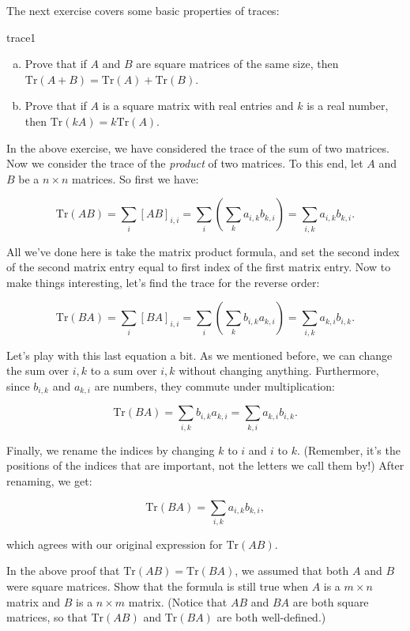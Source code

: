 The next exercise covers some basic properties of traces:

\begin{exercise}{trace1}
\begin{enumerate}[(a)]
\item
Prove that if $A$ and $B$ are square matrices of the same size, then $\text{Tr} \left( A + B \right) = \text{Tr} \left( A \right) + \text{Tr} \left( B \right)$.
\item
Prove that if $A$ is a square matrix with real entries and $k$ is a real number, then $\text{Tr} \left(k A  \right) = k\text{Tr} \left( A \right)$.
\end{enumerate}
\end{exercise}


In the above exercise, we have considered the trace of the sum of two matrices. Now we consider the trace of the \emph{product} of two matrices.  To this end, let ${A}$ and  ${B}$ be a $n \times n$ matrices.  So first we have:

\[ \text{Tr} \left({A} {B}\right) = \sum_{i} [AB]_{i,i} = \sum_{i}\left( \sum_k a_{i,k}b_{k,i}\right) = \sum_{i,k}a_{i,k}b_{k,i}. \]

All we've done here is take the matrix product formula, and set the second index of the second  matrix entry equal to first index of the first matrix entry.  Now to make things interesting, let's find the trace for the reverse order:

\[ \text{Tr} \left({B} {A}\right) = \sum_{i} [BA]_{i,i} = \sum_{i} \left( \sum_{k} b_{i,k}a_{k,i} \right) = \sum_{i,k}a_{k,i}b_{i,k}. \]

Let's play with this last equation a bit. As we mentioned before, we can change the sum over $i,k$ to a sum over $i,k$ without changing anything. Furthermore, since $b_{i,k}$ and $a_{k,i}$ are numbers, they commute under multiplication:

\[ \text{Tr} \left({B} {A}\right) =\sum_{i,k} b_{i,k}a_{k,i} =  \sum_{k,i} a_{k,i}b_{i,k}. \]

Finally, we rename the indices by changing $k$ to $i$ and $i$ to $k$.  (Remember, it's the positions of the indices that are important, not the letters we call them by!)  After renaming, we get:

\[ \text{Tr} \left({B} {A}\right) =\sum_{i,k} a_{i,k}b_{k,i}, \]

which agrees with our original expression for  $\text{Tr} ({A}{B})$.

\begin{exercise}{}
In the above proof that $\text{Tr} ({AB}) = \text{Tr}({BA})$, we assumed that both $A$ and $B$ were square matrices. Show that the formula is still true when $A$ is a $m \times n$ matrix and $B$ is a $n \times m$ matrix.  (Notice that $AB$ and $BA$ are both square matrices, so that $\text{Tr} \left({A} {B}\right)$ and $\text{Tr} \left({B} {A}\right)$ are both well-defined.)
\end{exercise}

